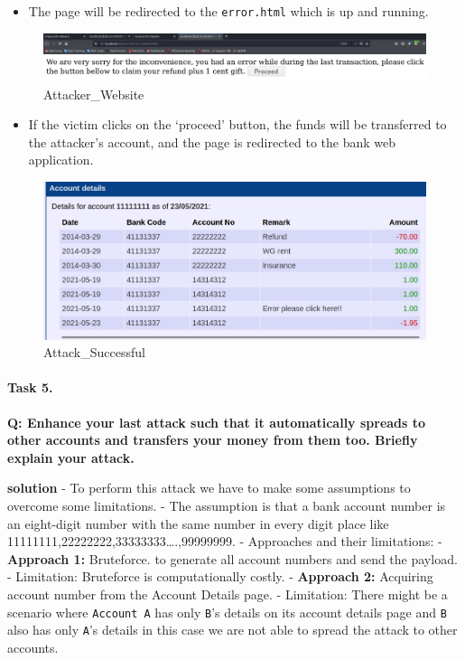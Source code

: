 \begin{itemize}
\tightlist
\item
  The page will be redirected to the \texttt{error.html} which is up and
  running.
\end{itemize}

\begin{figure}
\centering
\includegraphics{images/task2/1.4.1.JPG}
\caption{Attacker\_Website}
\end{figure}

\begin{itemize}
\tightlist
\item
  If the victim clicks on the `proceed' button, the funds will be
  transferred to the attacker's account, and the page is redirected to
  the bank web application.
\end{itemize}

\begin{figure}
\centering
\includegraphics{images/task2/1.4.2.JPG}
\caption{Attack\_Successful}
\end{figure}

\hypertarget{task-5.}{%
\paragraph{Task 5.}\label{task-5.}}

\textbf{Q: Enhance your last attack such that it automatically spreads
to other accounts and transfers your money from them too. Briefly
explain your attack.}

\textbf{solution} - To perform this attack we have to make some
assumptions to overcome some limitations. - The assumption is that a
bank account number is an eight-digit number with the same number in
every digit place like 11111111,22222222,33333333\ldots.,99999999. -
Approaches and their limitations: - \textbf{Approach 1:} Bruteforce. to
generate all account numbers and send the payload. - Limitation:
Bruteforce is computationally costly. - \textbf{Approach 2:} Acquiring
account number from the Account Details page. - Limitation: There might
be a scenario where \texttt{Account\ A} has only \texttt{B}'s details on
its account details page and \texttt{B} also has only \texttt{A}'s
details in this case we are not able to spread the attack to other
accounts.

